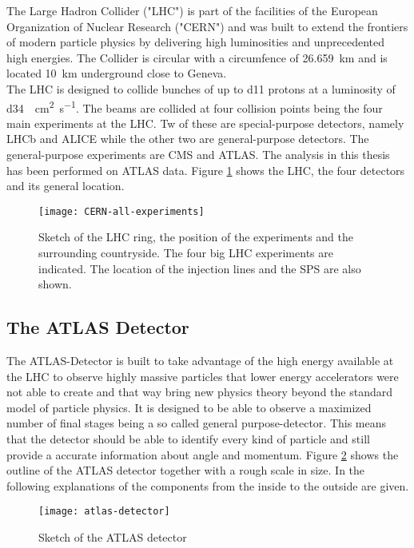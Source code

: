 The Large Hadron Collider ("LHC") is part of the facilities of the European Organization of Nuclear Research ("CERN") and was built to extend the frontiers of modern particle physics by delivering high luminosities and unprecedented high energies. The Collider is circular with a circumfence of \SI{26.659}{\km} and is located \SI{10}{\km} underground close to Geneva.\\
The LHC is designed to collide bunches of up to \num{d11} protons at a luminosity of \SI{d34}{\per\square\cm \per\s}. The beams are collided at four collision points being the four main experiments at the LHC. Tw of these are special-purpose detectors, namely LHCb and ALICE while the other two are general-purpose detectors.
The general-purpose experiments are CMS and ATLAS. The analysis in this thesis has been performed on ATLAS data.
Figure \ref{fig:LHC} shows the LHC, the four detectors and its general location.
\begin{figure}[h]
  \centering
  \texttt{[image: CERN-all-experiments]}
  \caption[Sketch of the LHC ring, the position of the experiments and
  the surrounding countryside.]{Sketch of the LHC ring, the position
    of the experiments and the surrounding countryside. The four big
    LHC experiments are indicated. The location of the injection lines
    and the SPS are also shown. \cite{atlasfigures}}
  \label{fig:LHC}
\end{figure}


\subsection{The ATLAS Detector}

The ATLAS-Detector is built to take advantage of the high energy available at the LHC to observe highly massive particles that lower energy accelerators were not able to create and that way bring new physics theory beyond the standard model of particle physics.
It is designed to be able to observe a maximized number of final stages being a so called general purpose-detector. This means that the detector should be able to identify every kind of particle and still provide a accurate information about angle and momentum.
Figure \ref{fig:atlas} shows the outline of the ATLAS detector together with a rough scale in size. In the following explanations of the components from the inside to the outside are given.

\begin{figure}[h]
  \centering
  \texttt{[image: atlas-detector]}
  \caption[Sketch of the ATLAS detector]{Sketch of the ATLAS detector \cite{atlasfigures}}
  \label{fig:atlas}
\end{figure}


